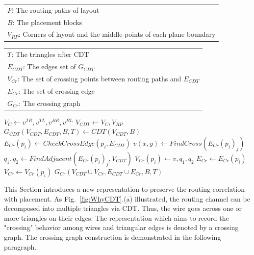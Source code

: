     \newcommand{\CCG}{\ensuremath{\mbox{\sc ConstCrossGraph}}}
    \begin{algorithm}[hbt]  
      \caption{$\CCG(P,B,V_{RP})$}\label{alg:CCG}                       
      \begin{scriptsize}
        \begin{algorithmic}[1]
          \REQUIRE 
            \begin{tabular}{l}
              $P$: The routing paths of layout\\
              $B$: The placement blocks \\
              $V_{RP}$: Corners of layout and the middle-points of each plane boundary\\ 
            \end{tabular}
          \ENSURE 
            \begin{tabular}{l}
              $T$: The triangles after CDT\\
              $E_{CDT}$: The edges set of $G_{CDT}$\\
              $V_{Cr}$: The set of crossing points between routing paths and $E_{CDT}$\\
              $E_{Cr}$: The set of crossing edge\\
              $G_{Cr}$: The crossing graph
            \end{tabular}
            \STATE $V_C \gets v^{TR},v^{TL},v^{BR},v^{BL} $ 
          \ENDFOR
          \STATE $V_{CDT}\gets V_C, V_{RP}$  \label{line:VCDT}
          \STATE $G_{CDT}(V_{CDT},E_{CDT},B,T) \gets CDT(V_{CDT},B)$   \label{line:GCDT}
           \label{line:StartCross}
            \STATE $E_{Cr}(p_i) \gets CheckCrossEdge(p_i,E_{CDT})$
              \STATE $v(x,y) \gets FindCross({E_{Cr}(p_i)}_j)$
              \STATE $q_1,q_2 \gets FindAdjacent({E_{Cr}(p_i)}_j,V_{CDT})$
              \STATE $V_{Cr}(p_i) \gets v,q_1,q_2$
            \ENDFOR
            \STATE $E_{Cr} \gets E_{Cr}(p_i)$
            \STATE $V_{Cr} \gets V_{Cr}(p_i)$
          \ENDFOR \label{line:EndCross}
          \RETURN $G_{Cr}(V_{CDT}\cup V_{Cr}, E_{CDT} \cup E_{Cr},B,T)$  
        \end{algorithmic}
      \end{scriptsize} 
    \end{algorithm}

    This Section introduces a new representation to preserve the routing correlation with placement. As Fig.~\ref{fig:WhyCDT}.(a) illustrated, the routing channel can be decomposed into multiple triangles via CDT. Thus, the wire goes across one or more triangles on their edges. The representation which aims to record the "crossing" behavior among wires and triangular edges is denoted by a crossing graph. The crossing graph construction is demonstrated in the following paragraph. 


